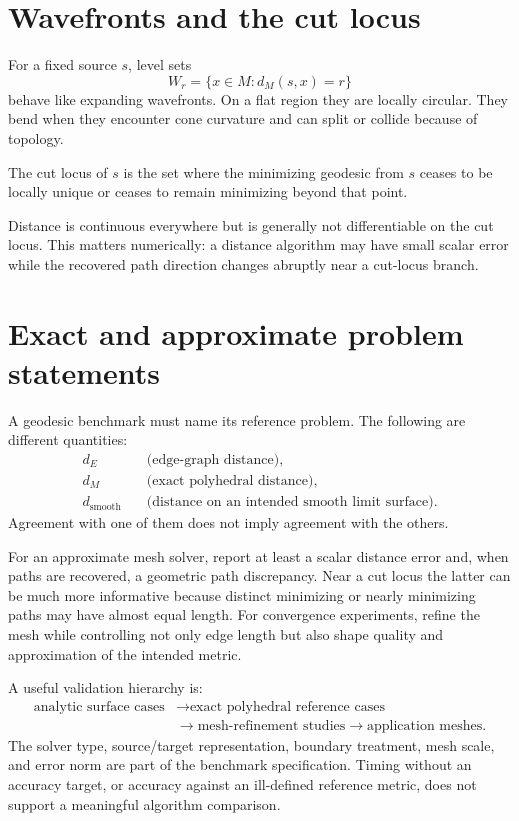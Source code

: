 \section{Wavefronts and the cut locus}

For a fixed source \(s\), level sets
\[
W_r=\{x\in M:d_M(s,x)=r\}
\]
behave like expanding wavefronts.  On a flat region they are locally circular.
They bend when they encounter cone curvature and can split or collide because of
topology.

\begin{definition}\label{def:vii38-cut}
The cut locus of \(s\) is the set where the minimizing geodesic from \(s\) ceases
to be locally unique or ceases to remain minimizing beyond that point.
\end{definition}

Distance is continuous everywhere but is generally not differentiable on the cut
locus.  This matters numerically: a distance algorithm may have small scalar
error while the recovered path direction changes abruptly near a cut-locus
branch.

\section{Exact and approximate problem statements}

\begin{remark}
A geodesic benchmark must name its reference problem.  The following are
different quantities:
\[
\begin{aligned}
d_E &\quad\text{(edge-graph distance)},\\
d_M &\quad\text{(exact polyhedral distance)},\\
d_{\mathrm{smooth}} &\quad\text{(distance on an intended smooth limit surface)}.
\end{aligned}
\]
Agreement with one of them does not imply agreement with the others.

For an approximate mesh solver, report at least a scalar distance error and,
when paths are recovered, a geometric path discrepancy.  Near a cut locus the
latter can be much more informative because distinct minimizing or nearly
minimizing paths may have almost equal length.  For convergence experiments,
refine the mesh while controlling not only edge length but also shape quality
and approximation of the intended metric.

A useful validation hierarchy is:
\[
\begin{aligned}
\text{analytic surface cases}
&\longrightarrow \text{exact polyhedral reference cases}\\
&\longrightarrow \text{mesh-refinement studies}
\longrightarrow \text{application meshes}.
\end{aligned}
\]
The solver type, source/target representation, boundary treatment, mesh scale,
and error norm are part of the benchmark specification.  Timing without an
accuracy target, or accuracy against an ill-defined reference metric, does not
support a meaningful algorithm comparison.
\end{remark}

